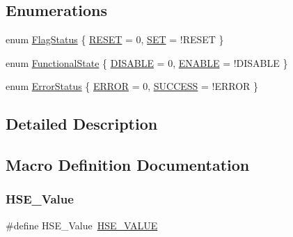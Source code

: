 \subsection*{Enumerations}
\begin{DoxyCompactItemize}
\item 
enum \mbox{\hyperlink{group___exported__types_ga89136caac2e14c55151f527ac02daaff}{Flag\+Status}} \{ \mbox{\hyperlink{group___exported__types_gga89136caac2e14c55151f527ac02daaffa589b7d94a3d91d145720e2fed0eb3a05}{R\+E\+S\+ET}} = 0, 
\mbox{\hyperlink{group___exported__types_gga89136caac2e14c55151f527ac02daaffab44c8101cc294c074709ec1b14211792}{S\+ET}} = !\+R\+E\+S\+ET
 \}
\item 
enum \mbox{\hyperlink{group___exported__types_gac9a7e9a35d2513ec15c3b537aaa4fba1}{Functional\+State}} \{ \mbox{\hyperlink{group___exported__types_ggac9a7e9a35d2513ec15c3b537aaa4fba1ad3a9df141be0ccf10389b640f492b26d}{D\+I\+S\+A\+B\+LE}} = 0, 
\mbox{\hyperlink{group___exported__types_ggac9a7e9a35d2513ec15c3b537aaa4fba1a7d46875fa3ebd2c34d2756950eda83bf}{E\+N\+A\+B\+LE}} = !\+D\+I\+S\+A\+B\+LE
 \}
\item 
enum \mbox{\hyperlink{group___exported__types_ga8333b96c67f83cba354b3407fcbb6ee8}{Error\+Status}} \{ \mbox{\hyperlink{group___exported__types_gga8333b96c67f83cba354b3407fcbb6ee8a2fd6f336d08340583bd620a7f5694c90}{E\+R\+R\+OR}} = 0, 
\mbox{\hyperlink{group___exported__types_gga8333b96c67f83cba354b3407fcbb6ee8ac7f69f7c9e5aea9b8f54cf02870e2bf8}{S\+U\+C\+C\+E\+SS}} = !\+E\+R\+R\+OR
 \}
\end{DoxyCompactItemize}


\subsection{Detailed Description}


\subsection{Macro Definition Documentation}
\mbox{\label{group___exported__types_gab12a1abe6dd0001e7a0487a8b175b28c}} 
\subsubsection{\texorpdfstring{HSE\_Value}{HSE\_Value}}
{\footnotesize\ttfamily \#define H\+S\+E\+\_\+\+Value~\mbox{\hyperlink{group___library__configuration__section_gaeafcff4f57440c60e64812dddd13e7cb}{H\+S\+E\+\_\+\+V\+A\+L\+UE}}}

